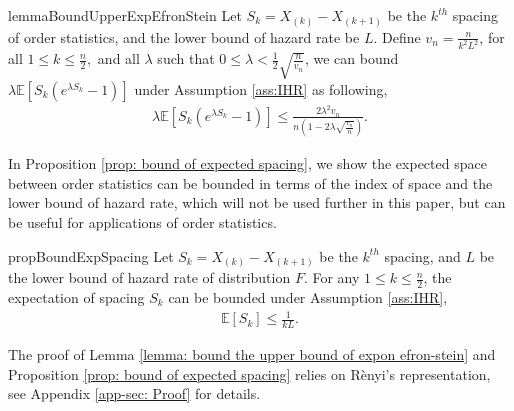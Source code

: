 \begin{restatable}{lemma}{BoundUpperExpEfronStein}
\label{lemma: bound the upper bound of expon efron-stein}
Let $S_{k} = X_{\left(k\right)}-X_{\left(k+1\right)}$ be the $k^{th}$ spacing of order statistics, and the lower bound of hazard rate be $L$. Define $v_n = \frac{n}{k^2 L^2}$, for all $ 1 \leq k \leq \frac{n}{2},$
and all $\lambda$ such that $0 \leq \lambda< \frac{1}{2} \sqrt{\frac{n}{v_n}}$, we can bound $\lambda \mathbb{E}\left[S_{k}\left(e^{\lambda S_{k}}-1\right)\right]$ under Assumption \ref{ass:IHR} as following,
\begin{align}
\label{equ: bound the right hand side of EES}
    \lambda \mathbb{E}\left[S_{k}\left(e^{\lambda S_{k}}-1\right)\right] \leq
    \frac{2 \lambda^{2} v_{n} }{n\left(1-2 \lambda \sqrt{\frac{v_{n}}{n}}\right)}.
\end{align}
\end{restatable}

In Proposition \ref{prop: bound of expected spacing}, we show the expected space between order statistics can be bounded in terms of the index of space and the lower bound of hazard rate, which will not be used further in this paper, but can be useful for applications of order statistics.


\begin{restatable}{prop}{BoundExpSpacing}
\label{prop: bound of expected spacing}
Let $S_{k} = X_{\left(k\right)}-X_{\left(k+1\right)}$ be the $k^{th}$ spacing, and $L$ be the lower bound of hazard rate of distribution $F$. For any $1 \leq k \leq \frac{n}{2}$, the expectation of spacing $S_k$ can be bounded under Assumption \ref{ass:IHR},
\begin{align}
    \mathbb{E}[S_k] \leq \frac{1}{kL}.
\end{align}
\end{restatable}

The proof of Lemma \ref{lemma: bound the upper bound of expon efron-stein} and Proposition \ref{prop: bound of expected spacing} relies on R\`enyi's representation, see Appendix \ref{app-sec: Proof} for details.


